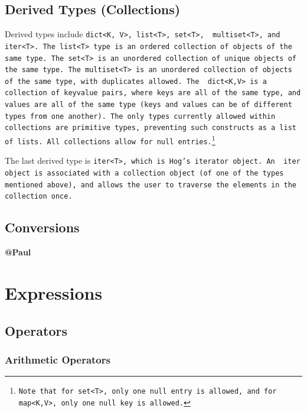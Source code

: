\documentclass{article}
\begin{document}
\subsection{Derived Types (Collections)} %
\label{sub:derived_types_collections_}

Derived types include \tt dict<K, V>\rm, \tt list<T>\rm, \tt set<T>\rm, \tt
multiset<T>\rm, and \tt iter<T>\rm. The \tt list<T> \rm type is an ordered
collection of objects of the same type. The \tt set<T> \rm is an unordered
collection of unique objects of the same type. The \tt multiset<T> \rm is an
unordered collection of objects of the same type, with duplicates allowed. The \tt
dict<K,V> \rm is a collection of key­value pairs, where keys are all of the same
type, and values are all of the same type (keys and values can be of different
types from one another). The only types currently allowed within collections are
primitive types, preventing such constructs as a list of lists. All collections
allow for null entries.\footnote{Note that for \tt set<T>\rm, only one \tt null
\rm entry is allowed, and for \tt map<K,V>\rm, only one \tt null \rm key is
allowed.}

The last derived type is \tt iter<T>\rm, which is Hog's iterator object. An \tt
iter \rm object is associated with a collection object (of one of the types
mentioned above), and allows the user to traverse the elements in the collection
once.


\subsection{Conversions} %
\label{sub:conversions}

\textbf{@Paul}



\section{Expressions} %
\label{sec:expressions}

\subsection{Operators} %
\label{sub:operators}

\subsubsection{Arithmetic Operators} %
\label{ssub:arithmetic_operators}
\end{document}
